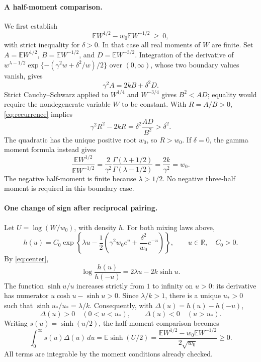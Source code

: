 \documentclass[11pt]{article}
\newcommand{\E}{\mathbb E}
\begin{document}
\paragraph{A half-moment comparison.}
We first establish
\begin{equation}\label{eq:moment}
 \E W^{1/2}-w_0\E W^{-1/2}\ \geq\ 0,
\end{equation}
with strict inequality for \(\delta>0\).
In that case all real moments of \(W\) are finite. Set
\(A=\E W^{1/2}\), \(B=\E W^{-1/2}\), and \(D=\E W^{-3/2}\).
Integration of the derivative of
\(w^{\lambda-1/2}\exp\{-(\gamma^2w+\delta^2/w)/2\}\)
over \((0,\infty)\), whose two boundary values vanish, gives
\begin{equation}\label{eq:recurrence}
 \gamma^2 A=2kB+\delta^2D.
\end{equation}
Strict Cauchy--Schwarz applied to \(W^{1/4}\) and \(W^{-3/4}\) gives
\(B^2<AD\); equality would require the nondegenerate variable \(W\)
to be constant. With \(R=A/B>0\), \eqref{eq:recurrence} implies
\[
 \gamma^2R^2-2kR
   =\delta^2\frac{AD}{B^2}>\delta^2.
\]
The quadratic has the unique positive root \(w_0\), so \(R>w_0\).
If \(\delta=0\), the gamma moment formula instead gives
\[
 \frac{\E W^{1/2}}{\E W^{-1/2}}
 =\frac{2}{\gamma^2}
     \frac{\Gamma(\lambda+1/2)}{\Gamma(\lambda-1/2)}
 =\frac{2k}{\gamma^2}=w_0.
\]
The negative half-moment is finite because \(\lambda>1/2\).
No negative three-half moment is required in this boundary case.

\paragraph{One change of sign after reciprocal pairing.}
Let \(U=\log(W/w_0)\), with density \(h\).
For both mixing laws above,
\[
 h(u)=C_0\exp\left\{\lambda u-
       \frac12\left(\gamma^2w_0e^u+
                       \frac{\delta^2}{w_0}e^{-u}\right)\right\},
 \qquad u\in\mathbb R,\quad C_0>0.
\]
By \eqref{eq:center},
\begin{equation}\label{eq:reflection}
 \log\frac{h(u)}{h(-u)}
      =2\lambda u-2k\sinh u.
\end{equation}
The function \(\sinh u/u\) increases strictly from \(1\) to infinity
on \(u>0\): its derivative has numerator \(u\cosh u-\sinh u>0\).
Since \(\lambda/k>1\), there is a unique \(u_*>0\) such that
\(\sinh u_*/u_*=\lambda/k\).
Consequently, with \(\Delta(u)=h(u)-h(-u)\),
\begin{equation}\label{eq:sign}
 \Delta(u)>0\quad(0<u<u_*),\qquad
 \Delta(u)<0\quad(u>u_*).
\end{equation}
Writing \(s(u)=\sinh(u/2)\), the half-moment comparison becomes
\begin{equation}\label{eq:weighted}
 \int_0^\infty s(u)\Delta(u)\,du
 =\E\sinh(U/2)
 =\frac{\E W^{1/2}-w_0\E W^{-1/2}}{2\sqrt{w_0}}
 \geq0.
\end{equation}
All terms are integrable by the moment conditions already checked.
\end{document}

